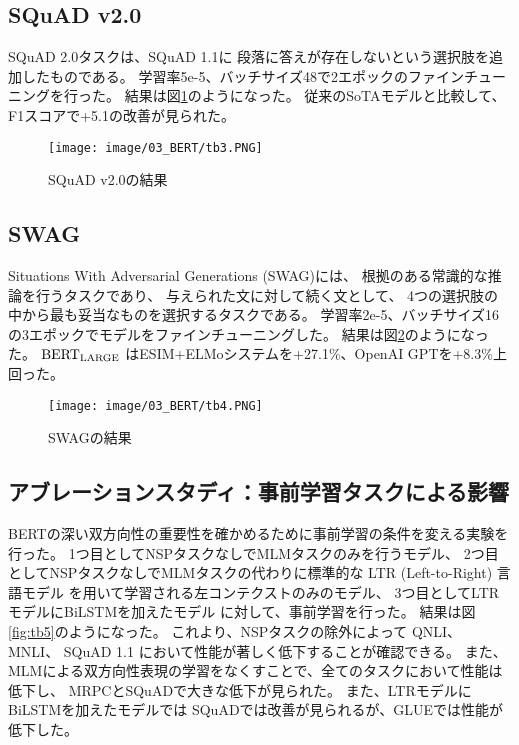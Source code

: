 \documentclass{jsarticle}
\begin{document}
\subsection{SQuAD v2.0}
SQuAD 2.0タスクは、SQuAD 1.1に
段落に答えが存在しないという選択肢を追加したものである。
学習率5e-5、バッチサイズ48で2エポックのファインチューニングを行った。
結果は図\ref{fig:tb3}のようになった。
従来のSoTAモデルと比較して、F1スコアで+5.1の改善が見られた。

\begin{figure}[H]
  \begin{center}
    \texttt{[image: image/03\_BERT/tb3.PNG]}
    \caption{SQuAD v2.0の結果}
    \label{fig:tb3}
  \end{center}
\end{figure}

\subsection{SWAG}
Situations With Adversarial Generations (SWAG)には、
根拠のある常識的な推論を行うタスクであり、
与えられた文に対して続く文として、
4つの選択肢の中から最も妥当なものを選択するタスクである。
学習率2e-5、バッチサイズ16の3エポックでモデルをファインチューニングした。
結果は図\ref{fig:tb4}のようになった。
$\rm BERT_{LARGE}$ はESIM+ELMoシステムを+27.1\%、OpenAI GPTを+8.3\%上回った。

\begin{figure}[H]
  \begin{center}
    \texttt{[image: image/03\_BERT/tb4.PNG]}
    \caption{SWAGの結果}
    \label{fig:tb4}
  \end{center}
\end{figure}


\subsection{アブレーションスタディ：事前学習タスクによる影響}
BERTの深い双方向性の重要性を確かめるために事前学習の条件を変える実験を行った。
1つ目としてNSPタスクなしでMLMタスクのみを行うモデル、
2つ目としてNSPタスクなしでMLMタスクの代わりに標準的な LTR (Left-to-Right) 言語モデル
を用いて学習される左コンテクストのみのモデル、
3つ目としてLTRモデルにBiLSTMを加えたモデル
に対して、事前学習を行った。
結果は図\ref{fig:tb5}のようになった。
これより、NSPタスクの除外によって
QNLI、 MNLI、 SQuAD 1.1 において性能が著しく低下することが確認できる。
また、MLMによる双方向性表現の学習をなくすことで、全てのタスクにおいて性能は低下し、
MRPCとSQuADで大きな低下が見られた。
また、LTRモデルにBiLSTMを加えたモデルでは
SQuADでは改善が見られるが、GLUEでは性能が低下した。
\end{document}
